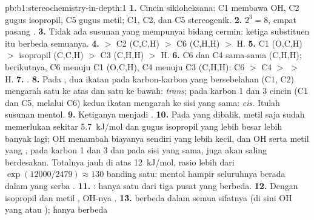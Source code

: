 \begin{solution}{pb:b1:stereochemistry-in-depth:1}
\textbf{1.} Cincin sikloheksana: C1 membawa OH, C2 gugus isopropil, C5
gugus metil; C1, C2, dan C5 stereogenik.
\textbf{2.} $2^3 = 8$, empat pasang .
\textbf{3.} Tidak ada susunan yang mempunyai bidang cermin: ketiga
substituen itu berbeda semuanya.
\textbf{4.}  $>$ C2 (C,C,H) $>$ C6 (C,H,H) $>$ H.
\textbf{5.} C1 (O,C,H) $>$ isopropil (C,C,H) $>$ C3 (C,H,H) $>$ H.
\textbf{6.} C6 dan C4 sama-sama (C,H,H); berikutnya, C6 menuju C1 (O,C,H),
C4 menuju C3 (C,H,H): C6 $>$ C4 $>$  $>$ H.
\textbf{7.} .
\textbf{8.} Pada , dua ikatan  pada karbon-karbon yang
bersebelahan (C1, C2) mengarah satu ke atas dan satu ke bawah:
\textit{trans}; pada karbon 1 dan 3 cincin (C1 dan C5, melalui C6) kedua
ikatan  mengarah ke sisi yang sama: \textit{cis}. Itulah
susunan mentol.
\textbf{9.} Ketiganya menjadi .
\textbf{10.} Pada  yang dibalik, metil saja sudah memerlukan sekitar
\qty{5.7}{kJ/mol} dan gugus isopropil yang lebih besar lebih banyak lagi;
OH menambah biayanya sendiri yang lebih kecil, dan OH serta metil yang
, pada karbon 1 dan 3 dan pada sisi yang sama, juga akan saling
berdesakan. Totalnya jauh di atas \qty{12}{kJ/mol}, rasio lebih dari
$\exp(12000/2479) \approx 130$ banding satu: mentol hampir seluruhnya
berada dalam  yang serba .
\textbf{11.} : hanya satu dari tiga pusat yang berbeda.
\textbf{12.} Dengan isopropil dan metil , OH-nya .
\textbf{13.}  berbeda dalam semua sifatnya (di sini  OH yang  atau );  hanya berbeda

\end{solution}
